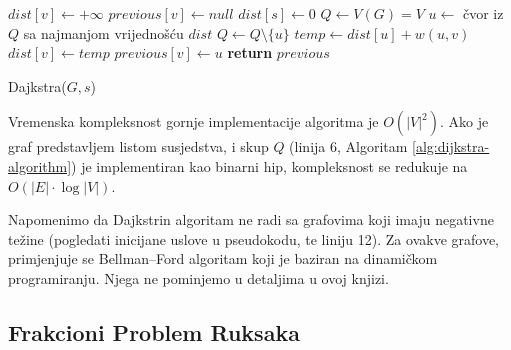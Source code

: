 \documentclass[a4paper, utf8, 11pt, colorlinks]{book}
\begin{document}
\begin{algorithm}[!ht]
	\begin{algorithmic}[1]
	      	\STATE   $dist[v] \gets +\infty$ 	%
		    \STATE $previous[v] \gets null$ 	%
		\ENDFOR
		\STATE	$dist[s] \gets 0$ 	 
		\STATE	$Q \gets V(G)=V$
		\STATE $u \gets$ čvor iz $Q$ sa najmanjom vrijednošću $dist$
		\STATE $Q \gets Q \setminus \{u\}$
		\STATE $temp \gets dist[u] + w(u, v)$
		\STATE  $dist[v] \gets temp$
		\STATE $previous[v] \gets u$ 
		\ENDIF
		\ENDFOR
		\ENDWHILE
		\STATE	\textbf{return} $previous$ 
	\end{algorithmic}
    		\caption{Dajkstra($G,s $)}\label{alg:dijkstra-algorithm}
\end{algorithm}

Vremenska kompleksnost gornje implementacije algoritma je $O(|V|^2)$. Ako je graf predstavljem listom susjedstva, i skup $Q$ (linija 6, Algoritam \ref{alg:dijkstra-algorithm}) je implementiran kao binarni hip, 
kompleksnost se redukuje na $O(|E| \cdot \log |V|)$.

Napomenimo da Dajkstrin algoritam ne radi sa grafovima koji imaju negativne težine (pogledati inicijane uslove u  pseudokodu, te liniju 12).  Za ovakve grafove,  primjenjuje se Bellman–Ford algoritam koji je baziran na dinamičkom programiranju. Njega ne pominjemo u detaljima u ovoj knjizi.  %

\subsection{Frakcioni Problem Ruksaka}
\end{document}
